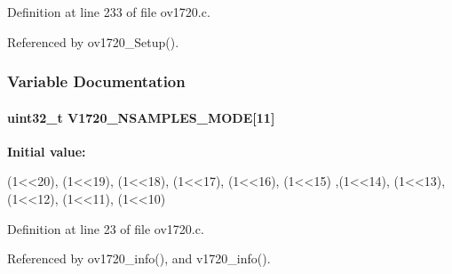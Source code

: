 Definition at line 233 of file ov1720.c.

Referenced by ov1720\_\-Setup().

\subsubsection{Variable Documentation}
\paragraph[{V1720\_\-NSAMPLES\_\-MODE}]{\setlength{\rightskip}{0pt plus 5cm}uint32\_\-t {\bf V1720\_\-NSAMPLES\_\-MODE}\mbox{[}11\mbox{]}}\hfill\label{ov1720_8c_a9585ae4c07e118efaed53e2a5e4ae703}
{\bfseries Initial value:}
\begin{DoxyCode}
 { (1<<20), (1<<19), (1<<18), (1<<17), (1<<16), (1<<15)
              ,(1<<14), (1<<13), (1<<12), (1<<11), (1<<10)}
\end{DoxyCode}


Definition at line 23 of file ov1720.c.

Referenced by ov1720\_\-info(), and v1720\_\-info().